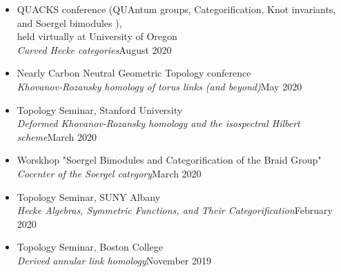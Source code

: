 \documentclass[12pt]{amsart}
\renewcommand{\j}{\indent}
\begin{document}
\begin{itemize}
\item[$\cdot$]QUACKS conference (QUAntum groups, Categorification, Knot invariants, and Soergel bimodules ),\\
\j held virtually at University of Oregon\\
\j \emph{Curved Hecke categories}\hfill August 2020

 
\item[$\cdot$]Nearly Carbon Neutral Geometric Topology conference\\
\j \emph{Khovanov-Rozansky homology of torus links (and beyond)}\hfill May 2020

\item[$\cdot$]Topology Seminar, Stanford University \\
\j \emph{Deformed Khovanov-Rozansky homology and the isospectral Hilbert scheme}\hfill March 2020

\item[$\cdot$]Worskhop "Soergel Bimodules and Categorification of the Braid Group" \\
\j \emph{Cocenter of the Soergel category}\hfill March 2020


\item[$\cdot$]Topology Seminar, SUNY Albany\\
\j\emph{Hecke Algebras, Symmetric Functions, and Their Categorification}\hfill February 2020

\item[$\cdot$]Topology Seminar, Boston College\\
\j \emph{Derived annular link homology}\hfill November 2019


\end{itemize}
\end{document}
